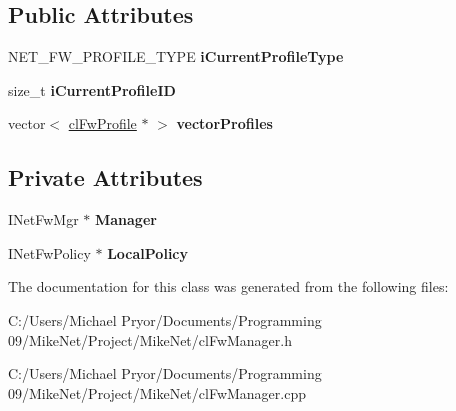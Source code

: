 \subsection*{Public Attributes}
\begin{DoxyCompactItemize}
\item 
\hypertarget{classcl_fw_manager_a8a0e2e32682da0b1e3497b2309c901c7}{
NET\_\-FW\_\-PROFILE\_\-TYPE {\bfseries iCurrentProfileType}}
\label{classcl_fw_manager_a8a0e2e32682da0b1e3497b2309c901c7}

\item 
\hypertarget{classcl_fw_manager_ab1e6f67436745af91d246b90d6e812a3}{
size\_\-t {\bfseries iCurrentProfileID}}
\label{classcl_fw_manager_ab1e6f67436745af91d246b90d6e812a3}

\item 
\hypertarget{classcl_fw_manager_a7b4d97365f8ab10f89cc802f828956ff}{
vector$<$ \hyperlink{classcl_fw_profile}{clFwProfile} $\ast$ $>$ {\bfseries vectorProfiles}}
\label{classcl_fw_manager_a7b4d97365f8ab10f89cc802f828956ff}

\end{DoxyCompactItemize}
\subsection*{Private Attributes}
\begin{DoxyCompactItemize}
\item 
\hypertarget{classcl_fw_manager_aace1bd6a98745d908f4f073aa2441fc1}{
INetFwMgr $\ast$ {\bfseries Manager}}
\label{classcl_fw_manager_aace1bd6a98745d908f4f073aa2441fc1}

\item 
\hypertarget{classcl_fw_manager_a04861385f18e5cfb5cdc0146b6a68cea}{
INetFwPolicy $\ast$ {\bfseries LocalPolicy}}
\label{classcl_fw_manager_a04861385f18e5cfb5cdc0146b6a68cea}

\end{DoxyCompactItemize}


The documentation for this class was generated from the following files:\begin{DoxyCompactItemize}
\item 
C:/Users/Michael Pryor/Documents/Programming 09/MikeNet/Project/MikeNet/clFwManager.h\item 
C:/Users/Michael Pryor/Documents/Programming 09/MikeNet/Project/MikeNet/clFwManager.cpp\end{DoxyCompactItemize}
